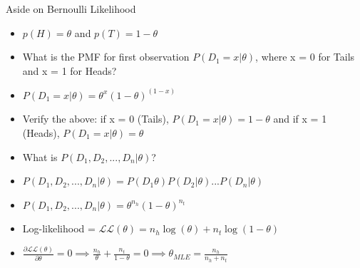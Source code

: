\documentclass{beamer}
\begin{document}
\begin{frame}{Aside on Bernoulli Likelihood}
\begin{itemize}[<+->]
\item $p(H) = \theta$ and $p(T) = 1 - \theta$
\item What is the PMF for first observation $P(D_1 = x|\theta)$, where x = 0 for Tails and x = 1 for Heads?
\item $P(D_1 = x|\theta) = \theta^x(1-\theta)^{(1-x)}$
\item Verify the above: if x = 0 (Tails), $P(D_1 = x|\theta) = 1 - \theta$ and if x = 1 (Heads), $P(D_1 = x|\theta)  = \theta$
\item What is $P(D_1, D_2, ..., D_n|\theta)$?
\item $P(D_1, D_2, ..., D_n|\theta) = P(D_1\theta)P(D_2|\theta)...P(D_n|\theta)$
\item $P(D_1, D_2, ..., D_n|\theta) =\theta^{n_h}(1-\theta)^{n_t}$
\item Log-likelihood = $\mathcal{LL}(\theta) = n_h\log(\theta) + n_t\log(1-\theta)$
\item $\frac{\partial \mathcal{LL}(\theta)}{\partial \theta} = 0 \implies \frac{n_h}{\theta} + \frac{n_t}{1-\theta} = 0 \implies \theta_{MLE} = \frac{n_h}{n_h + n_t}$

\end{itemize}

\end{frame}







\end{document}

